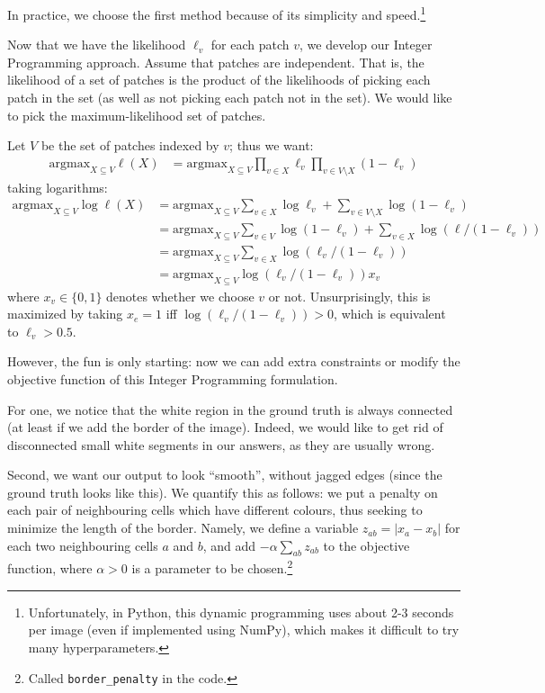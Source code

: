 In practice, we choose the first method because of its simplicity and speed.\footnote{Unfortunately, in Python, this dynamic programming uses about 2-3 seconds per image (even if implemented using NumPy), which makes it difficult to try many hyperparameters.}

Now that we have the likelihood $\ell_v$ for each patch $v$, we develop our Integer Programming approach. Assume that patches are independent. That is, the likelihood of a set of patches is the product of the likelihoods of picking each patch in the set (as well as not picking each patch not in the set). We would like to pick the maximum-likelihood set of patches.

\newcommand{\argmax}{\mathrm{argmax}}
Let $V$ be the set of patches indexed by $v$; thus we want:
\begin{align*}
\argmax_{X \subseteq V} \ell(X) &= \argmax_{X \subseteq V} \prod_{v \in X} \ell_v \prod_{v \in V \setminus X} (1 - \ell_v)
\end{align*}
taking logarithms:
\begin{align*}
\argmax_{X \subseteq V} \log \ell(X) &= \argmax_{X \subseteq V} \sum_{v \in X} \log \ell_v + \sum_{v \in V \setminus X} \log (1 - \ell_v) \\
&= \argmax_{X \subseteq V} \sum_{v \in V} \log (1 - \ell_v) + \sum_{v \in X} \log (\ell / (1 - \ell_v)) \\
&= \argmax_{X \subseteq V} \sum_{v \in X} \log (\ell_v / (1 - \ell_v)) \\
&= \argmax_{X \subseteq V} \log (\ell_v / (1 - \ell_v)) x_v
\end{align*}
where $x_v \in \{0,1\}$ denotes whether we choose $v$ or not. Unsurprisingly, this is maximized by taking $x_e = 1$ iff $\log(\ell_v / (1 - \ell_v)) > 0$, which is equivalent to $\ell_v > 0.5$.

However, the fun is only starting: now we can add extra constraints or modify the objective function of this Integer Programming formulation.

For one, we notice that the white region in the ground truth is always connected (at least if we add the border of the image). Indeed, we would like to get rid of disconnected small white segments in our answers, as they are usually wrong.

Second, we want our output to look ``smooth'', without jagged edges (since the ground truth looks like this). We quantify this as follows: we put a penalty on each pair of neighbouring cells which have different colours, thus seeking to minimize the length of the border. Namely, we define a variable $z_{ab} = |x_a - x_b|$ for each two neighbouring cells $a$ and $b$, and add $- \alpha \sum_{ab} z_{ab}$ to the objective function, where $\alpha > 0$ is a parameter to be chosen.\footnote{Called \texttt{border_penalty} in the code.}

